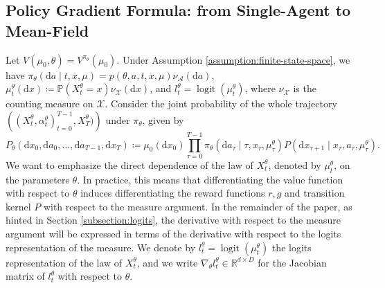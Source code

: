 \documentclass[11pt]{article}
\numberwithin{equation}{section}
\theoremstyle{definition}
\theoremstyle{remark}
\def\cA{\mathcal{A}}
\def\cX{\mathcal{X}}
\def\d{{\mathrm{d}}}
\def\R{{\mathbb R}}
\DeclareMathOperator*{\logit}{logit}
\begin{document}
\subsection{Policy Gradient Formula: from Single-Agent to Mean-Field}

Let $V(\mu_0, \theta) = V^{\pi_{\theta}}(\mu_0)$. Under Assumption \ref{assumption:finite-state-space}, we have $\pi_{\theta}(\d a \mid t,x,\mu) = p(\theta, a,t,x,\mu) \nu_{\cA}(\d a)$, $\mu_t^{\theta}(\d x) \coloneq  \mathbb P(X_t^\theta = x) \nu_{\cX}(\d x)$, and $l_t^\theta = \logit (\mu_t^\theta)$, where $\nu_{\cX}$ is the counting measure on $\cX$. 
Consider the joint probability of the whole trajectory $\left((X_t^{\theta}, \alpha_t^{\theta})_{t = 0}^{T - 1}, X_{T}^{\theta} )\right)$ under $\pi_{\theta}$, given by 
\[
P_{\theta}(\d x_0, \d a_0, \ldots, \d a_{T - 1}, \d x_T) \coloneq \mu_0(\d x_0) \prod_{\tau = 0}^{T - 1} \pi_{\theta} (\d a_\tau \mid \tau,x_{\tau}, \mu_\tau^{\theta}) P(\d x_{\tau + 1} \mid x_{\tau}, a_{\tau}, \mu_{\tau}^\theta).
\]
We want to emphasize the direct dependence of the law of $X_t^\theta$, denoted by $\mu_t^\theta$, on the parameters $\theta$. In practice, this means that differentiating the value function with respect to $\theta$ induces differentiating the reward functions $r,g$ and transition kernel $P$ with respect to the measure argument.
In the remainder of the paper, as hinted in Section \ref{subsection:logits}, the derivative with respect to the measure argument will be expressed in terms of the derivative with respect to the logits representation of the measure.
We denote by $l_t^\theta = \logit (\mu_t^\theta)$ the logits representation of the law of $X_t^\theta$, and we write $\nabla_\theta l_t^\theta \in \R^{d \times D}$ for the Jacobian matrix of $l_t^\theta$ with respect to $\theta$.
\end{document}
